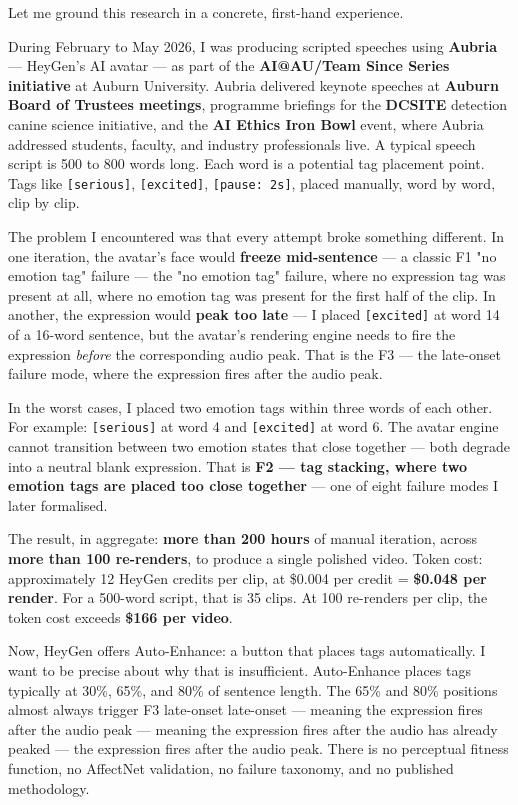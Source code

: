 \documentclass[12pt,a4paper]{article}
\begin{document}
\begin{speechbox}
Let me ground this research in a concrete, first-hand experience.

During February to May 2026, I was producing scripted speeches using \textbf{Aubria} ---
HeyGen's AI avatar --- as part of the \textbf{AI@AU/Team Since Series initiative} at Auburn University.
Aubria delivered keynote speeches at \textbf{Auburn Board of Trustees meetings}, programme
briefings for the \textbf{DCSITE} detection canine science initiative, and the
\textbf{AI Ethics Iron Bowl} event, where Aubria addressed students, faculty, and
industry professionals live. A typical speech script is 500 to 800 words long.
Each word is a potential tag placement point. Tags like \texttt{[serious]}, \texttt{[excited]},
\texttt{[pause: 2s]}, placed manually, word by word, clip by clip.

The problem I encountered was that every attempt broke something different. In one iteration,
the avatar's face would \textbf{freeze mid-sentence} --- a classic F1 "no emotion tag" failure — the "no emotion tag" failure, where no expression tag was present at all, where no emotion
tag was present for the first half of the clip. In another, the expression would \textbf{peak
too late} --- I placed \texttt{[excited]} at word 14 of a 16-word sentence, but the avatar's
rendering engine needs to fire the expression \textit{before} the corresponding audio peak.
That is the F3 — the late-onset failure mode, where the expression fires after the audio peak.

In the worst cases, I placed two emotion tags within three words of each other. For example:
\texttt{[serious]} at word 4 and \texttt{[excited]} at word 6. The avatar engine cannot transition
between two emotion states that close together --- both degrade into a neutral blank expression.
That is \textbf{F2 — tag stacking, where two emotion tags are placed too close together} --- one of eight failure modes I later formalised.

The result, in aggregate: \textbf{more than 200 hours} of manual iteration, across \textbf{more
than 100 re-renders}, to produce a single polished video. Token cost: approximately 12 HeyGen
credits per clip, at \$0.004 per credit = \textbf{\$0.048 per render}. For a 500-word script,
that is 35 clips. At 100 re-renders per clip, the token cost exceeds \textbf{\$166 per video}.

Now, HeyGen offers Auto-Enhance: a button that places tags automatically. I want to be precise
about why that is insufficient. Auto-Enhance places tags typically at 30\%, 65\%, and 80\%
of sentence length. The 65\% and 80\% positions almost always trigger F3 late-onset late-onset — meaning the expression fires after the audio peak — meaning the expression fires after the audio has already peaked --- the
expression fires after the audio peak. There is no perceptual fitness function, no AffectNet
validation, no failure taxonomy, and no published methodology.


\end{speechbox}
\end{document}
